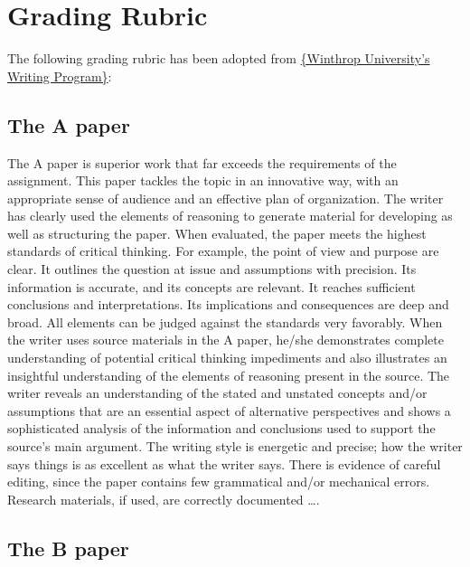 
\chapter{Grading Rubric}


The following grading rubric has been adopted from 
\href{http://www2.winthrop.edu/english/WritingProgram/rubric.htm}{\{Winthrop University's Writing Program\}}:

\section{The A paper}
The A paper is superior work that far exceeds the requirements of the assignment. This 
paper tackles the topic in an innovative way, with an appropriate sense of audience 
and an effective plan of organization. The writer has clearly used the elements of 
reasoning to generate material for developing as well as structuring the paper. When 
evaluated, the paper meets the highest standards of critical thinking. For example, the 
point of view and purpose are clear. It outlines the question at issue and assumptions 
with precision. Its information is accurate, and its concepts are relevant. It reaches 
sufficient conclusions and interpretations. Its implications and consequences are deep 
and broad. All elements can be judged against the standards very favorably. When the 
writer uses source materials in the A paper, he/she demonstrates complete 
understanding of potential critical thinking impediments and also illustrates an insightful 
understanding of the elements of reasoning present in the source. The writer reveals 
an understanding of the stated and unstated concepts and/or assumptions that are an 
essential aspect of alternative perspectives and shows a sophisticated analysis of the 
information and conclusions used to support the source’s main argument. The writing 
style is energetic and precise; how the writer says things is as excellent as what the 
writer says. There is evidence of careful editing, since the paper contains few 
grammatical and/or mechanical errors. Research materials, if used, are correctly 
documented \dots.

\section{The B paper}

